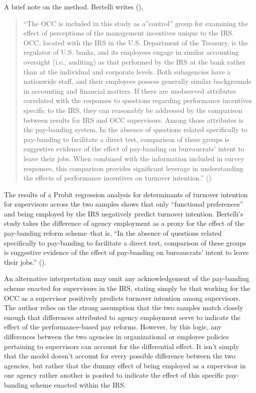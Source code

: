\documentclass[
  11pt,
  a4paper,
]{article}
\begin{document}
A brief note on the method. Bertelli writes
(),

\begin{quote}
``The OCC is included in this study as a''control'' group for examining
the effect of perceptions of the management incentives unique to the
IRS. OCC, located with the IRS in the U.S. Department of the Treasury,
is the regulator of U.S. banks, and its employees engage in similar
accounting oversight (i.e., auditing) as that performed by the IRS at
the bank rather than at the individual and corporate levels. Both
subagencies have a nationwide staff, and their employees possess
generally similar backgrounds in accounting and financial matters. If
there are unobserved attributes correlated with the responses to
questions regarding performance incentives specific to the IRS, they can
reasonably be addressed by the comparison between results for IRS and
OCC supervisors. Among those attributes is the pay-banding system. In
the absence of questions related specifically to pay-banding to
facilitate a direct test, comparison of these groups is suggestive
evidence of the effect of pay-banding on bureaucrats' intent to leave
their jobs. When combined with the information included in survey
responses, this comparison provides significant leverage in
understanding the effects of performance incentives on turnover
intention.'' ()
\end{quote}

The results of a Probit regression analysis for determinants of turnover
intention for supervisors across the two samples shows that only
``functional preferences'' and being employed by the IRS negatively
predict turnover intention. Bertelli's study takes the difference of
agency employment as a proxy for the effect of the pay-banding reform
scheme--that is, ``In the absence of questions related specifically to
pay-banding to facilitate a direct test, comparison of these groups is
suggestive evidence of the effect of pay-banding on bureaucrats' intent
to leave their jobs.'' ().

An alternative interpretation may omit any acknowledgement of the
pay-banding scheme enacted for supervisors in the IRS, stating simply be
that working for the OCC as a supervisor positively predicts turnover
intention among supervisors. The author relies on the strong assumption
that the two samples match closely enough that differences attributed to
agency employment serve to indicate the effect of the performance-based
pay reforms. However, by this logic, any differences between the two
agencies in organizational or employee policies pertaining to
supervisors can account for the differential effect. It isn't simply
that the model doesn't account for every possible difference between the
two agencies, but rather that the dummy effect of being employed as a
supervisor in one agency rather another is posited to indicate the
effect of this specific pay-banding scheme enacted within the IRS.
\end{document}

